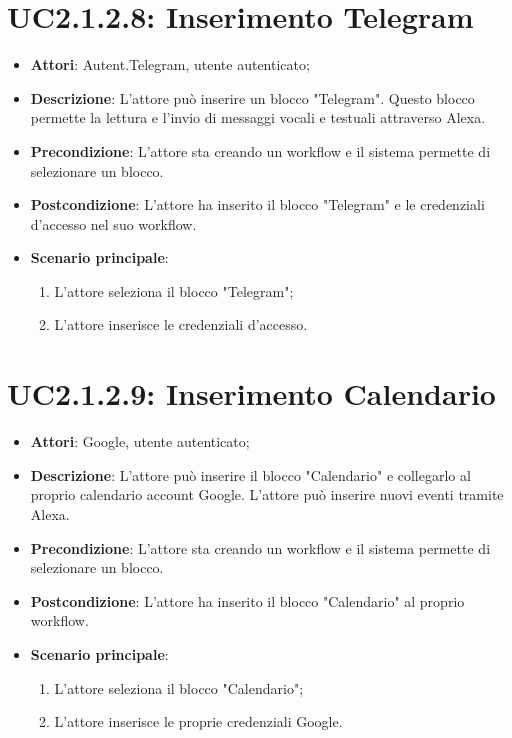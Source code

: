 \section{UC2.1.2.8: Inserimento Telegram}
\label{UC2.1.2.8}
\begin{itemize}
	\item \textbf{Attori}: Autent.Telegram, utente autenticato;
	\item \textbf{Descrizione}: L'attore può inserire un blocco "Telegram". Questo blocco permette la lettura e l'invio di messaggi vocali e testuali attraverso Alexa.
	\item \textbf{Precondizione}: L'attore sta creando un workflow e il sistema permette di selezionare un blocco.
	\item \textbf{Postcondizione}: L'attore ha inserito il blocco "Telegram" e le credenziali d'accesso nel suo workflow.
	\item \textbf{Scenario principale}:
	\begin{enumerate} \item L'attore seleziona il blocco "Telegram";  \item  L'attore inserisce le credenziali d'accesso.\end{enumerate}
\end{itemize}

\section{UC2.1.2.9: Inserimento Calendario}
\label{UC2.1.2.9}
\begin{itemize}
	\item \textbf{Attori}: Google, utente autenticato;
	\item \textbf{Descrizione}: L'attore può inserire il blocco "Calendario" e collegarlo al proprio calendario account Google. L'attore può inserire nuovi eventi tramite Alexa.
	\item \textbf{Precondizione}: L'attore sta creando un workflow e il sistema permette di selezionare un blocco.
	\item \textbf{Postcondizione}: L'attore ha inserito il blocco "Calendario" al proprio workflow.
	\item \textbf{Scenario principale}:
	\begin{enumerate} \item L'attore seleziona il blocco "Calendario";  \item  L'attore inserisce le proprie credenziali Google.\end{enumerate}
\end{itemize}

